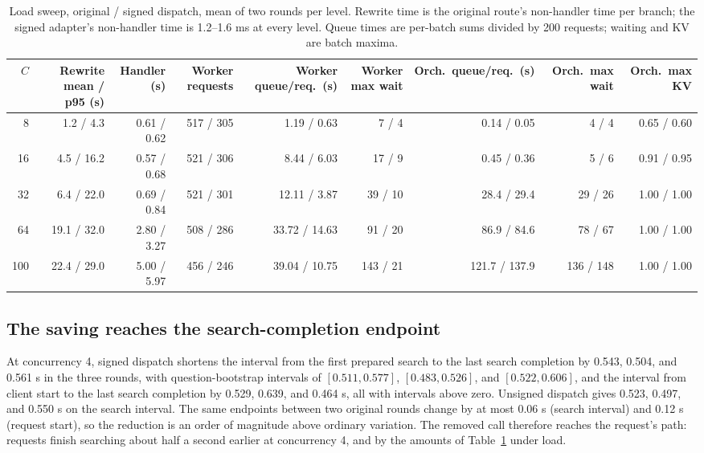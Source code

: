 \documentclass[paper]{ieice}
\begin{document}
\begin{table}[!t]
\caption{Load sweep, original / signed dispatch, mean of two rounds per level. Rewrite time is the original route's non-handler time per branch; the signed adapter's non-handler time is 1.2--1.6 ms at every level. Queue times are per-batch sums divided by 200 requests; waiting and KV are batch maxima.}
\label{tab:sweep-boundary}
\centering\footnotesize
\setlength{\tabcolsep}{2pt}
\begin{tabular}{rrrrrrrrr}
\toprule
$C$ & Rewrite mean / p95 (s) & Handler (s) & Worker requests & Worker queue/req.\ (s) & Worker max wait & Orch.\ queue/req.\ (s) & Orch.\ max wait & Orch.\ max KV\\
\midrule
8 & 1.2 / 4.3 & 0.61 / 0.62 & 517 / 305 & 1.19 / 0.63 & 7 / 4 & 0.14 / 0.05 & 4 / 4 & 0.65 / 0.60\\
16 & 4.5 / 16.2 & 0.57 / 0.68 & 521 / 306 & 8.44 / 6.03 & 17 / 9 & 0.45 / 0.36 & 5 / 6 & 0.91 / 0.95\\
32 & 6.4 / 22.0 & 0.69 / 0.84 & 521 / 301 & 12.11 / 3.87 & 39 / 10 & 28.4 / 29.4 & 29 / 26 & 1.00 / 1.00\\
64 & 19.1 / 32.0 & 2.80 / 3.27 & 508 / 286 & 33.72 / 14.63 & 91 / 20 & 86.9 / 84.6 & 78 / 67 & 1.00 / 1.00\\
100 & 22.4 / 29.0 & 5.00 / 5.97 & 456 / 246 & 39.04 / 10.75 & 143 / 21 & 121.7 / 137.9 & 136 / 148 & 1.00 / 1.00\\
\bottomrule
\end{tabular}
\end{table}

\subsection{The saving reaches the search-completion endpoint}
At concurrency 4, signed dispatch shortens the interval from the first prepared search to the last search completion by 0.543, 0.504, and 0.561 s in the three rounds, with question-bootstrap intervals of $[0.511,0.577]$, $[0.483,0.526]$, and $[0.522,0.606]$, and the interval from client start to the last search completion by 0.529, 0.639, and 0.464 s, all with intervals above zero. Unsigned dispatch gives 0.523, 0.497, and 0.550 s on the search interval. The same endpoints between two original rounds change by at most 0.06 s (search interval) and 0.12 s (request start), so the reduction is an order of magnitude above ordinary variation. The removed call therefore reaches the request's path: requests finish searching about half a second earlier at concurrency 4, and by the amounts of Table~\ref{tab:sweep-boundary} under load.
\end{document}

